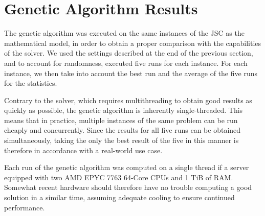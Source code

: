 \documentclass{mimosis}
\begin{document}

\section{Genetic Algorithm Results} \label{sec:gen_alg_results}

The genetic algorithm was executed on the same instances of the JSC as the mathematical model, in order to obtain a proper comparison with the capabilities of the solver. We used the settings described at the end of the previous section, and to account for randomness, executed five runs for each instance. For each instance, we then take into account the best run and the average of the five runs for the statistics.

Contrary to the solver, which requires multithreading to obtain good results as quickly as possible, the genetic algorithm is inherently single-threaded. This means that in practice, multiple instances of the same problem can be run cheaply and concurrently. Since the results for all five runs can be obtained simultaneously, taking the only the best result of the five in this manner is therefore in accordance with a real-world use case.

Each run of the genetic algorithm was computed on a single thread if a server equipped with two AMD EPYC 7763 64-Core CPUs and 1 TiB of RAM. Somewhat recent hardware should therefore have no trouble computing a good solution in a similar time, assuming adequate cooling to ensure continued performance.
\end{document}
